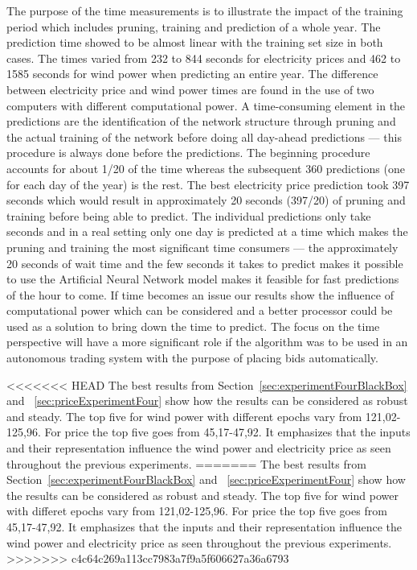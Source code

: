 The purpose of the time measurements is to illustrate the impact of the training period which includes pruning, training and prediction of a whole year. The prediction time showed to be almost linear with the training set size in both cases. The times varied from 232 to 844 seconds for electricity prices and 462 to 1585 seconds for wind power when predicting an entire year. The difference between electricity price and wind power times are found in the use of two computers with different computational power. A time-consuming element in the predictions are the identification of the network structure through pruning and the actual training of the network before doing all day-ahead predictions --- this procedure is always done before the predictions. The beginning procedure accounts for about 1/20 of the time whereas the subsequent 360 predictions (one for each day of the year) is the rest. The best electricity price prediction took 397 seconds which would result in approximately 20 seconds (397/20) of pruning and training before being able to predict. The individual predictions only take seconds and in a real setting only one day is predicted at a time which makes the pruning and training the most significant time consumers --- the approximately 20 seconds of wait time and the few seconds it takes to predict makes it possible to use the Artificial Neural Network model makes it feasible for fast predictions of the hour to come. If time becomes an issue our results show the influence of computational power which can be considered and a better processor could be used as a solution to bring down the time to predict. The focus on the time perspective will have a more significant role if the algorithm was to be used in an autonomous trading system with the purpose of placing bids automatically.  

<<<<<<< HEAD
The best results from Section~\ref{sec:experimentFourBlackBox} and ~\ref{sec:priceExperimentFour} show how the results can be considered as robust and steady. The top five for wind power with different epochs vary from 121,02-125,96. For price the top five goes from 45,17-47,92. It emphasizes that the inputs and their representation influence the wind power and electricity price as seen throughout the previous experiments.
=======
The best results from Section~\ref{sec:experimentFourBlackBox} and ~\ref{sec:priceExperimentFour} show how the results can be considered as robust and steady. The top five for wind power with differet epochs vary from 121,02-125,96. For price the top five goes from 45,17-47,92. It emphasizes that the inputs and their representation influence the wind power and electricity price as seen throughout the previous experiments.
>>>>>>> c4c64c269a113cc7983a7f9a5f606627a36a6793
